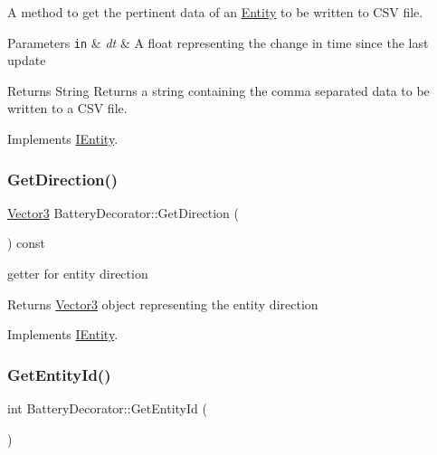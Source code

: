 A method to get the pertinent data of an \hyperlink{classEntity}{Entity} to be written to C\+SV file. 


\begin{DoxyParams}[1]{Parameters}
\mbox{\tt in}  & {\em dt} & A float representing the change in time since the last update\\
\hline
\end{DoxyParams}
\begin{DoxyReturn}{Returns}
String Returns a string containing the comma separated data to be written to a C\+SV file. 
\end{DoxyReturn}


Implements \hyperlink{classIEntity_a4d9355e68c6be349f57dc67fc1c036ba}{I\+Entity}.

\mbox{\label{classBatteryDecorator_a8487174df54456fe29406927f0542720}} 
\subsubsection{\texorpdfstring{Get\+Direction()}{GetDirection()}}
{\footnotesize\ttfamily \hyperlink{classVector3}{Vector3} Battery\+Decorator\+::\+Get\+Direction (\begin{DoxyParamCaption}{ }\end{DoxyParamCaption}) const\hspace{0.3cm}{\ttfamily [virtual]}}



getter for entity direction 

\begin{DoxyReturn}{Returns}
\hyperlink{classVector3}{Vector3} object representing the entity direction 
\end{DoxyReturn}


Implements \hyperlink{classIEntity_aa99a8fef8b22195a5113c38ef51f086d}{I\+Entity}.

\mbox{\label{classBatteryDecorator_a38fb935ea609ef4e38ebb50e70200a43}} 
\subsubsection{\texorpdfstring{Get\+Entity\+Id()}{GetEntityId()}}
{\footnotesize\ttfamily int Battery\+Decorator\+::\+Get\+Entity\+Id (\begin{DoxyParamCaption}{ }\end{DoxyParamCaption})\hspace{0.3cm}{\ttfamily [virtual]}}



